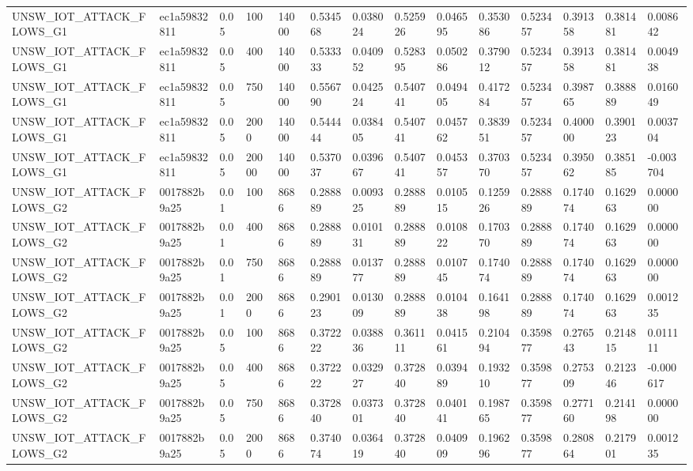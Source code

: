 \begin{tabular}{llllllllllllll}
UNSW\_IOT\_ATTACK\_FLOWS\_G1 & ec1a59832811 & 0.05 & 100 & 14000 & 0.534568 & 0.038024 & 0.525926 & 0.046595 & 0.353086 & 0.523457 & 0.391358 & 0.381481 & 0.008642 \\
UNSW\_IOT\_ATTACK\_FLOWS\_G1 & ec1a59832811 & 0.05 & 400 & 14000 & 0.533333 & 0.040952 & 0.528395 & 0.050286 & 0.379012 & 0.523457 & 0.391358 & 0.381481 & 0.004938 \\
UNSW\_IOT\_ATTACK\_FLOWS\_G1 & ec1a59832811 & 0.05 & 750 & 14000 & 0.556790 & 0.042524 & 0.540741 & 0.049405 & 0.417284 & 0.523457 & 0.398765 & 0.388889 & 0.016049 \\
UNSW\_IOT\_ATTACK\_FLOWS\_G1 & ec1a59832811 & 0.05 & 2000 & 14000 & 0.544444 & 0.038405 & 0.540741 & 0.045762 & 0.383951 & 0.523457 & 0.400000 & 0.390123 & 0.003704 \\
UNSW\_IOT\_ATTACK\_FLOWS\_G1 & ec1a59832811 & 0.05 & 20000 & 14000 & 0.537037 & 0.039667 & 0.540741 & 0.045357 & 0.370370 & 0.523457 & 0.395062 & 0.385185 & -0.003704 \\
UNSW\_IOT\_ATTACK\_FLOWS\_G2 & 0017882b9a25 & 0.01 & 100 & 8686 & 0.288889 & 0.009325 & 0.288889 & 0.010515 & 0.125926 & 0.288889 & 0.174074 & 0.162963 & 0.000000 \\
UNSW\_IOT\_ATTACK\_FLOWS\_G2 & 0017882b9a25 & 0.01 & 400 & 8686 & 0.288889 & 0.010131 & 0.288889 & 0.010822 & 0.170370 & 0.288889 & 0.174074 & 0.162963 & 0.000000 \\
UNSW\_IOT\_ATTACK\_FLOWS\_G2 & 0017882b9a25 & 0.01 & 750 & 8686 & 0.288889 & 0.013777 & 0.288889 & 0.010745 & 0.174074 & 0.288889 & 0.174074 & 0.162963 & 0.000000 \\
UNSW\_IOT\_ATTACK\_FLOWS\_G2 & 0017882b9a25 & 0.01 & 2000 & 8686 & 0.290123 & 0.013009 & 0.288889 & 0.010438 & 0.164198 & 0.288889 & 0.174074 & 0.162963 & 0.001235 \\
UNSW\_IOT\_ATTACK\_FLOWS\_G2 & 0017882b9a25 & 0.05 & 100 & 8686 & 0.372222 & 0.038836 & 0.361111 & 0.041561 & 0.210494 & 0.359877 & 0.276543 & 0.214815 & 0.011111 \\
UNSW\_IOT\_ATTACK\_FLOWS\_G2 & 0017882b9a25 & 0.05 & 400 & 8686 & 0.372222 & 0.032927 & 0.372840 & 0.039489 & 0.193210 & 0.359877 & 0.275309 & 0.212346 & -0.000617 \\
UNSW\_IOT\_ATTACK\_FLOWS\_G2 & 0017882b9a25 & 0.05 & 750 & 8686 & 0.372840 & 0.037301 & 0.372840 & 0.040141 & 0.198765 & 0.359877 & 0.277160 & 0.214198 & 0.000000 \\
UNSW\_IOT\_ATTACK\_FLOWS\_G2 & 0017882b9a25 & 0.05 & 2000 & 8686 & 0.374074 & 0.036419 & 0.372840 & 0.040909 & 0.196296 & 0.359877 & 0.280864 & 0.217901 & 0.001235 \\

\end{tabular}
